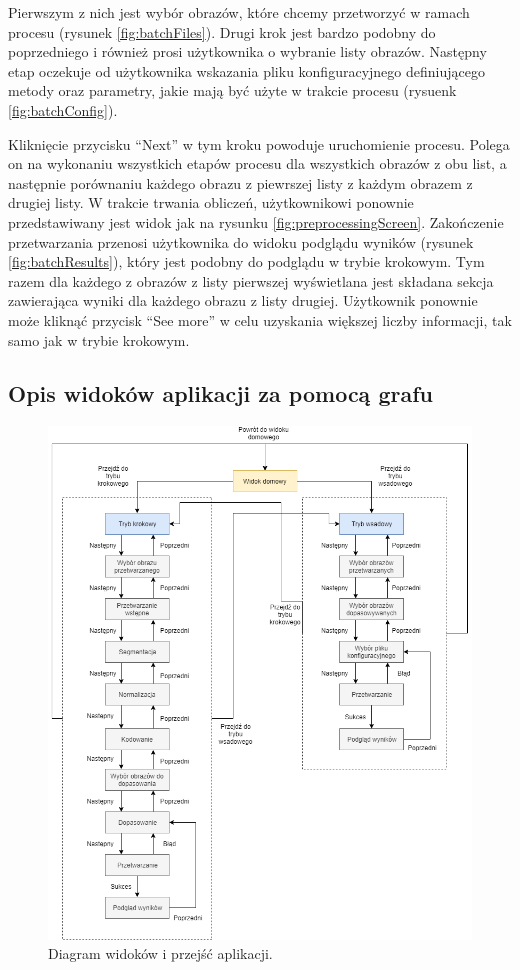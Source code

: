 Pierwszym z nich
jest wybór obrazów, które chcemy przetworzy\'c w ramach procesu (rysunek \ref{fig:batchFiles}).
Drugi krok jest bardzo podobny do poprzedniego i również prosi użytkownika o wybranie listy obrazów.
Następny etap oczekuje od użytkownika wskazania pliku konfiguracyjnego definiującego metody oraz
parametry, jakie mają by\'c użyte w trakcie procesu (rysuenk \ref{fig:batchConfig}).\newline

Kliknięcie
przycisku ``Next'' w tym kroku powoduje uruchomienie procesu. Polega on na wykonaniu wszystkich etapów
procesu dla wszystkich obrazów z obu list, a następnie porównaniu każdego obrazu z piewrszej listy
z każdym obrazem z drugiej listy. W trakcie trwania obliczeń, użytkownikowi ponownie przedstawiwany
jest widok jak na rysunku \ref{fig:preprocessingScreen}. Zakończenie przetwarzania przenosi użytkownika
do widoku podglądu wyników (rysunek \ref{fig:batchResults}), który jest podobny do podglądu w trybie krokowym. Tym razem dla każdego
z obrazów z listy pierwszej wyświetlana jest składana sekcja zawierająca wyniki dla każdego obrazu
z listy drugiej. Użytkownik ponownie może klikną\'c przycisk ``See more'' w celu uzyskania większej
liczby informacji, tak samo jak w trybie krokowym.\newpage

\subsection{Opis widoków aplikacji za pomocą grafu}

\begin{figure}[h]
    \centering
    \includegraphics[width=\textwidth,height=\textheight, keepaspectratio]{images/widokiMgr.png}
    \caption{Diagram widoków i przejś\'c aplikacji.}
\end{figure}
